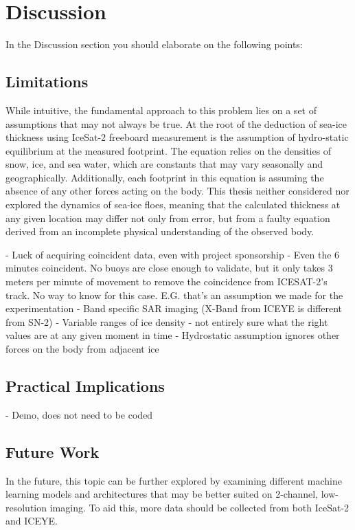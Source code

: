 \chapter{Discussion}
\label{sec:Discussion}

In the Discussion section you should elaborate on the following points:

\section{Limitations}
While intuitive, the fundamental approach to this problem lies on a set of assumptions that may not always be true. At the root of the deduction of sea-ice thickness using IceSat-2 freeboard measurement is the assumption of hydro-static equilibrium at the measured footprint. The equation relies on the densities of snow, ice, and sea water, which are constants that may vary seasonally and geographically. Additionally, each footprint in this equation is assuming the absence of any other forces acting on the body. This thesis neither considered nor explored the dynamics of sea-ice floes, meaning that the calculated thickness at any given location may differ not only from error, but from a faulty equation derived from an incomplete physical understanding of the observed body. 

- Luck of acquiring coincident data, even with project sponsorship
  - Even the 6 minutes coincident. No buoys are close enough to validate, but it only takes 3 meters per minute of movement to remove the coincidence from ICESAT-2's track. No way to know for this case. E.G. that's an assumption we made for the experimentation
- Band specific SAR imaging (X-Band from ICEYE is different from SN-2)
- Variable ranges of ice density - not entirely sure what the right values are at any given moment in time
- Hydrostatic assumption ignores other forces on the body from adjacent ice

\section{Practical Implications}
- Demo, does not need to be coded
\section{Future Work}
In the future, this topic can be further explored by examining different machine learning models and architectures that may be better suited on 2-channel, low-resolution imaging. To aid this, more data should be collected from both IceSat-2 and ICEYE.
